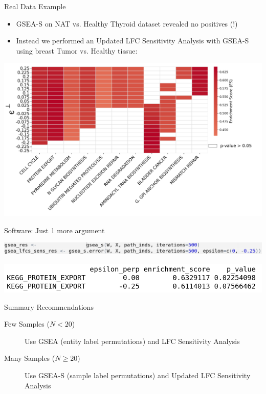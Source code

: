 \documentclass{beamer}
\begin{document}
\begin{frame}[label={sec:org39578c9}]{Real Data Example}
  \begin{itemize}
  \item GSEA-S on NAT vs. Healthy Thyroid dataset revealed no positives (!)
    \pause
    \item Instead we performed an Updated LFC Sensitivity Analysis with GSEA-S using breast Tumor vs. Healthy tissue:
  \end{itemize}
  \begin{center}
    \includegraphics[width=0.85\linewidth]{./images/breast_data.png}
  \end{center}
\end{frame}
\begin{frame}[label={sec:or543}]{Software: Just 1 more argument}
   \begin{center}
    \includegraphics[width=1\linewidth]{./images/software_sl.png}
   \end{center}
   \begin{center}
    \includegraphics[width=1\linewidth]{./images/sl_output.png}
  \end{center} 
\end{frame}
\begin{frame}[label={sec:org224e0aa}]{Summary Recommendations}
\begin{description}
\item[{Few Samples (\(N<20\))}] Use GSEA (entity label permutations) and LFC Sensitivity Analysis
\end{description}
\vfill
\begin{description}
\item[{Many Samples (\(N\ge 20\))}] Use GSEA-S (sample label permutations) and Updated LFC Sensitivity Analysis
\end{description}
\end{frame}
\end{document}
